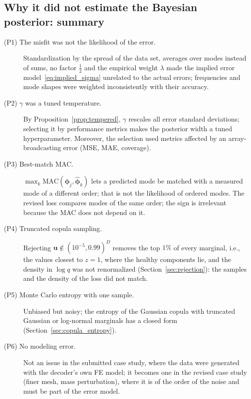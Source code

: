 \documentclass[11pt,a4paper]{article}
\numberwithin{equation}{section}
\theoremstyle{plain}
\theoremstyle{definition}
\theoremstyle{remark}
\newcommand{\uu}{\mathbf{u}}
\newcommand{\MAC}{\mathrm{MAC}}
\begin{document}
\subsection{Why it did not estimate the Bayesian posterior: summary}
\begin{description}
\item[(P1) The misfit was not the likelihood of the error.] Standardization by the spread of the data set, averages over modes instead of sums, no factor $\tfrac12$ and the empirical weight $\lambda$ made the implied error model~\eqref{eq:implied_sigma} unrelated to the actual errors; frequencies and mode shapes were weighted inconsistently with their accuracy.
\item[(P2) $\gamma$ was a tuned temperature.] By Proposition~\ref{prop:tempered}, $\gamma$ rescales all error standard deviations; selecting it by performance metrics makes the posterior width a tuned hyperparameter. Moreover, the selection used metrics affected by an array-broadcasting error (MSE, MAE, coverage).
\item[(P3) Best-match MAC.] $\max_k\MAC(\bm\phi_j,\hat{\bm\phi}_k)$ lets a predicted mode be matched with a measured mode of a different order; that is not the likelihood of ordered modes. The revised loss compares modes of the same order; the sign is irrelevant because the MAC does not depend on it.
\item[(P4) Truncated copula sampling.] Rejecting $\uu\notin(10^{-5},0.99)^D$ removes the top $1\%$ of every marginal, i.e., the values closest to $z=1$, where the healthy components lie, and the density in $\log q$ was not renormalized (Section~\ref{sec:rejection}): the samples and the density of the loss did not match.
\item[(P5) Monte Carlo entropy with one sample.] Unbiased but noisy; the entropy of the Gaussian copula with truncated Gaussian or log-normal marginals has a closed form (Section~\ref{sec:copula_entropy}).
\item[(P6) No modeling error.] Not an issue in the submitted case study, where the data were generated with the decoder's own FE model; it becomes one in the revised case study (finer mesh, mass perturbation), where it is of the order of the noise and must be part of the error model.
\end{description}
\end{document}

